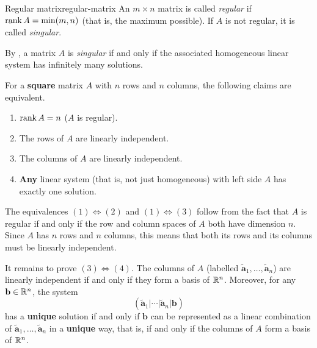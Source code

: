 \begin{definition}{Regular matrix}{regular-matrix}
 An $m \times n$ matrix is called \emph{regular} if $\operatorname{rank} A = \min(m,n)$ (that
 is, the maximum possible). If $A$ is not regular, it is called \emph{singular}.
\end{definition}

\begin{remark}{}{}
 By , a matrix $A$ is \emph{singular}
 if and only if the associated homogeneous linear system has infinitely many
 solutions.
\end{remark}

\begin{corollary}{}{}
 For a \textbf{square} matrix $A$ with $n$ rows and $n$ columns, the following
 claims are equivalent.
 \begin{enumerate}
  \item $\operatorname{rank} A = n$ ($A$ is regular).
  \item The rows of $A$ are linearly independent.
  \item The columns of $A$ are linearly independent.
  \item \textbf{Any} linear system (that is, not just homogeneous) with left
   side $A$ has exactly one solution.
 \end{enumerate}
\end{corollary}
\begin{corproof}

 The equivalences $(1) \Leftrightarrow (2)$ and $(1) \Leftrightarrow (3)$ follow
 from the fact that $A$ is regular if and only if the row and column spaces of
 $A$ both have dimension $n$. Since $A$ has $n$ rows and $n$ columns, this means
 that both its rows and its columns must be linearly independent.

 It remains to prove $(3) \Leftrightarrow (4)$. The columns of $A$ (labelled
 $\tilde{\mathbf{a}}_1,\ldots,\tilde{\mathbf{a}}_n$) are linearly independent if
 and only if they form a basis of $\mathbb{R}^{n}$. Moreover, for any $\mathbf{b} \in
 \mathbb{R}^{n}$, the system
 \[
  (\tilde{\mathbf{a}}_1 | \cdots | \tilde{\mathbf{a}}_n | \mathbf{b})
 \]
 has a \textbf{unique} solution if and only if $\mathbf{b}$ can be represented
 as a linear combination of $\tilde{\mathbf{a}}_1,\ldots,\tilde{\mathbf{a}}_n$
 in a \textbf{unique} way, that is, if and only if the columns of $A$ form a
 basis of $\mathbb{R}^{n}$. 
\end{corproof}


